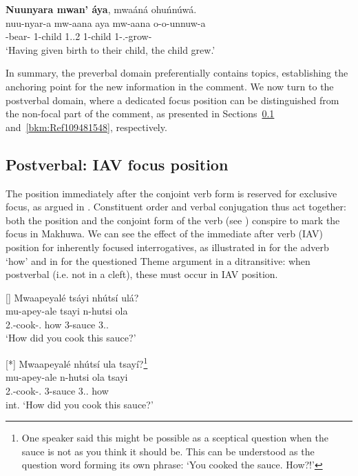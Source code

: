 \documentclass[output=paper]{langscibook}
\begin{document}
\sn
\textbf{Nuunyara mwan’ áya}, mwaáná ohuńnúwá.\\
\gll
nuu-nyar-a  mw-aana  aya  mw-aana  o-o-unnuw-a\\
\RSM{}-bear-\FV{}  1-child  1.\POSS{}.2  1-child  1\SM{}-\PFV{}.\DJ{}-grow-\FV{}\\
\glt
‘Having given birth to their child, the child grew.’
\z

In summary, the preverbal domain preferentially contains topics, establishing the anchoring point for the new information in the comment. We now turn to the postverbal domain, where a dedicated focus position can be distinguished from the non-focal part of the comment, as presented in Sections~\ref{bkm:Ref95489959} and~\ref{bkm:Ref109481548}, respectively.

\subsection{Postverbal: IAV focus position}
\label{bkm:Ref95489959}
The position immediately after the conjoint verb form is reserved for exclusive focus, as argued in \citet{vanderWal2011}. Constituent order and verbal conjugation thus act together: both the position and the conjoint form of the verb (see ) conspire to mark the focus in Makhuwa. We can see the effect of the immediate after verb (IAV) position for inherently focused interrogatives, as illustrated in  for the adverb ‘how’ and in  for the questioned Theme argument in a ditransitive: when postverbal (i.e. not in a cleft), these must occur in IAV position.

\ea
\label{bkm:Ref95378898}
\ea
[]{
Mwaapeyalé tsáyi nhútsí ulá?\\
\gll
mu-apey-ale  tsayi  n-hutsi  ola\\
2\PL{}.\SM{}-cook-\PFV{}.\CJ{}  how  3-sauce  3.\DEM{}.\PROX{}\\
\glt
‘How did you cook this sauce?’\\
}

\ex
[*]{
Mwaapeyalé nhútsí ula tsayí?\footnote{One speaker said this might be possible as a sceptical question when the sauce is not as you think it should be. This can be understood as the question word forming its own phrase: ‘You cooked the sauce. How?!’}\\
\gll
mu-apey-ale  n-hutsi  ola  tsayi\\
2\PL{}.\SM{}-cook-\PFV{}.\CJ{}  3-sauce  3.\DEM{}.\PROX{}  how\\
\glt
int. ‘How did you cook this sauce?’\\
}
\end{document}

